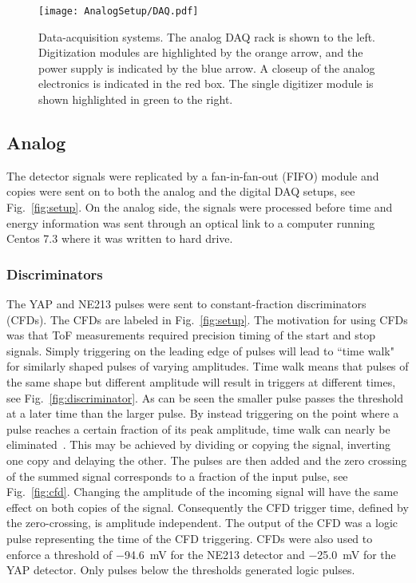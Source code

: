 \documentclass[main.tex]{subfiles}
\begin{document}
\begin{figure}[h]
    \centering
        \texttt{[image: AnalogSetup/DAQ.pdf]}
        \caption[Data-acquisition systems.]{Data-acquisition systems. The analog DAQ rack is shown to the left. Digitization modules are highlighted by the orange arrow, and the power supply is indicated by the blue arrow. A closeup of the analog electronics is indicated in the red box. The single digitizer module is shown highlighted in green to the right.}
    \label{fig:DAQ}
\end{figure}

\subsection{Analog}
The detector signals were replicated by a fan-in-fan-out (FIFO) module and copies were sent on to both the analog and the digital DAQ setups, see Fig.~\ref{fig:setup}. On the analog side, the signals were processed before time and energy information was sent through an optical link to a computer running Centos 7.3 where it was written to hard drive. 

\subsubsection{Discriminators}
The YAP and NE213 pulses were sent to constant-fraction discriminators (CFDs). The CFDs are labeled  in Fig.~\ref{fig:setup}. The motivation for using CFDs was that ToF measurements required precision timing of the start and stop signals. Simply triggering on the leading edge of pulses will lead to ``time walk" for similarly shaped pulses of varying amplitudes. Time walk means that pulses of the same shape but different amplitude will result in triggers at different times, see Fig.~\ref{fig:discriminator}. As can be seen the smaller pulse passes the threshold at a later time than the larger pulse. By instead triggering on the point where a pulse reaches a certain fraction of its peak amplitude, time walk can nearly be eliminated~\cite{Leo}. This may be achieved by dividing or copying the signal, inverting one copy and delaying the other. The pulses are then added and the zero crossing of the summed signal corresponds to a fraction of the input pulse, see Fig.~\ref{fig:cfd}. Changing the amplitude of the incoming signal will have the same effect on both copies of the signal. Consequently the CFD trigger time, defined by the zero-crossing, is amplitude independent. The output of the CFD was a logic pulse representing the time of the CFD triggering. CFDs were also used to enforce a threshold of \SI{-94.6}{mV} for the NE213 detector and \SI{-25.0}{mV} for the YAP detector. Only pulses below the thresholds generated logic pulses.
\end{document}
